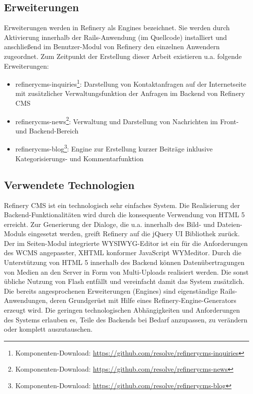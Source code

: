 \subsection{Erweiterungen}
Erweiterungen werden in Refinery als Engines bezeichnet. Sie werden durch Aktivierung innerhalb der Rails-Anwendung (im Quellcode) installiert und anschließend im Benutzer-Modul von Refinery den einzelnen Anwendern zugeordnet. Zum Zeitpunkt der Erstellung dieser Arbeit existieren u.a. folgende Erweiterungen:
\begin{itemize}
\item
refinerycms-inquiries\footnote{Komponenten-Download: \href{https://github.com/resolve/refinerycms-inquiries}{https://github.com/resolve/refinerycms-inquiries}}: Darstellung von Kontaktanfragen auf der Internetseite mit zusätzlicher Verwaltungsfunktion der Anfragen im Backend von Refinery CMS
\item
refinerycms-news\footnote{Komponenten-Download: \href{https://github.com/resolve/refinerycms-news}{https://github.com/resolve/refinerycms-news}}: Verwaltung und Darstellung von Nachrichten im Front- und Backend-Bereich
\item
 refinerycms-blog\footnote{Komponenten-Download: \href{https://github.com/resolve/refinerycms-blog}{https://github.com/resolve/refinerycms-blog}}: Engine zur Erstellung kurzer Beiträge inklusive Kategorisierungs- und Kommentarfunktion
\end{itemize}

\subsection{Verwendete Technologien}
Refinery CMS ist ein technologisch sehr einfaches System. Die Realisierung der Backend-Funktionalitäten wird durch die konsequente Verwendung von HTML 5 erreicht. Zur Generierung der Dialoge, die u.a. innerhalb des Bild- und Dateien-Moduls eingesetzt werden, greift Refinery auf die jQuery UI Bibliothek zurück. Der im Seiten-Modul integrierte WYSIWYG-Editor ist ein für die Anforderungen des WCMS angepasster, XHTML konformer JavaScript WYMeditor.
Durch die Unterstützung von HTML 5 innerhalb des Backend können Datenübertragungen von Medien an den Server in Form von Multi-Uploads realisiert werden. Die sonst übliche Nutzung von Flash entfällt und vereinfacht damit das System zusätzlich.
Die bereits angesprochenen Erweiterungen (Engines) sind eigenständige Rails-Anwendungen, deren Grundgerüst mit Hilfe eines Refinery-Engine-Generators erzeugt wird.
Die geringen technologischen Abhängigkeiten und Anforderungen des Systems erlauben es, Teile des Backends bei Bedarf anzupassen, zu verändern oder komplett auszutauschen.


